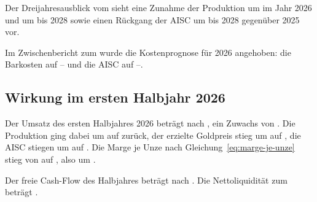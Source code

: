\FloatBarrier

Der Dreijahresausblick vom  sieht eine Zunahme der
Produktion um \Pct{\ProgSechsProdDelta} im Jahr 2026 und um
\Pct{\ProgAchtProdDelta} bis 2028 sowie einen R\"uckgang der AISC um
\Pct{\ProgAchtAISCRueckgang} bis 2028 gegen\"uber 2025
vor.

Im Zwischenbericht zum  wurde die Kostenprognose f\"ur
2026 angehoben: die Barkosten auf
\JeUnze{\PrognoseCashUnten}--\JeUnze{\PrognoseCashOben} und die AISC auf
\JeUnze{\PrognoseAiscUntenNeu}--\JeUnze{\PrognoseAiscObenNeu}.

\subsection{Wirkung im ersten Halbjahr 2026}

Der Umsatz des ersten Halbjahres 2026 betr\"agt \MioUSDexakt{\HJUmsatz} nach
\MioUSDexakt{\HJUmsatzVJ}, ein Zuwachs von \Pct{\HJUmsatzDelta}. Die
Produktion ging dabei um \PctBetrag{\HJProduktionDelta} auf
\Unzen{\HJProduktion} zur\"uck, der erzielte Goldpreis stieg um
\Pct{\HJGoldpreisDelta} auf \JeUnze{\HJGoldpreis}, die AISC stiegen um
\Pct{\HJAISCDelta} auf \JeUnze{\HJAISC}. Die Marge je Unze nach
Gleichung~\eqref{eq:marge-je-unze} stieg von \JeUnze{\HJMargeJeUnzeVJ} auf
\JeUnze{\HJMargeJeUnze}, also um \Pct{\HJMargeJeUnzeDelta}.

Der freie Cash-Flow des Halbjahres betr\"agt \MioUSDexakt{\HJFreierCashflow}
nach \MioUSDexakt{\HJFreierCashflowVJ}. Die
Nettoliquidit\"at zum  betr\"agt
\MioUSDexakt{\HJNettoliquiditaet}.

